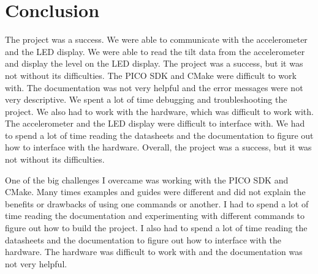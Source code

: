 \documentclass{article}
\begin{document}
\section*{Conclusion}
The project was a success. We were able to communicate with the accelerometer and the LED display. We were able to read the tilt data from the accelerometer and display the level on the LED display. The project was a success, but it was not without its difficulties. The PICO SDK and CMake were difficult to work with. The documentation was not very helpful and the error messages were not very descriptive. We spent a lot of time debugging and troubleshooting the project. We also had to work with the hardware, which was difficult to work with. The accelerometer and the LED display were difficult to interface with. We had to spend a lot of time reading the datasheets and the documentation to figure out how to interface with the hardware. Overall, the project was a success, but it was not without its difficulties.

One of the big challenges I overcame was working with the PICO SDK and CMake. Many times examples and guides were different and did not explain the benefits or drawbacks of using one commands or another. I had to spend a lot of time reading the documentation and experimenting with different commands to figure out how to build the project. I also had to spend a lot of time reading the datasheets and the documentation to figure out how to interface with the hardware. The hardware was difficult to work with and the documentation was not very helpful.
\end{document}

